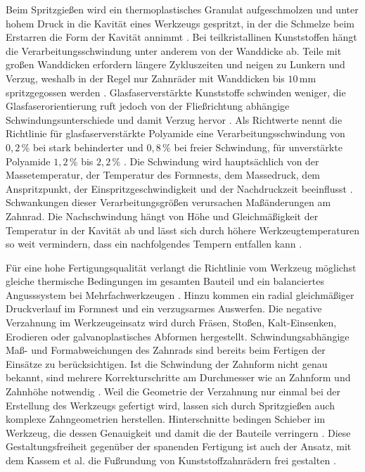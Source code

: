 Beim Spritzgießen wird ein thermoplastisches Granulat aufgeschmolzen und unter hohem Druck in die Kavität eines Werkzeugs gespritzt, in der die Schmelze beim Erstarren die Form der Kavität annimmt \cite[S.~25]{VDI2736-1}. Bei teilkristallinen Kunststoffen hängt die Verarbeitungsschwindung unter anderem von der Wanddicke ab. Teile mit großen Wanddicken erfordern längere Zykluszeiten und neigen zu Lunkern und Verzug, weshalb in der Regel nur Zahnräder mit Wanddicken bis $10$\,mm spritzgegossen werden \cite[S.~25]{VDI2736-1}. Glasfaserverstärkte Kunststoffe schwinden weniger, die Glasfaserorientierung ruft jedoch von der Fließrichtung abhängige Schwindungsunterschiede und damit Verzug hervor \cite[S.~25]{VDI2736-1}. Als Richtwerte nennt die Richtlinie für glasfaserverstärkte Polyamide eine Verarbeitungsschwindung von $0{,}2$\,\% bei stark behinderter und $0{,}8$\,\% bei freier Schwindung, für unverstärkte Polyamide $1{,}2$\,\% bis $2{,}2$\,\% \cite[S.~26]{VDI2736-1}. Die Schwindung wird hauptsächlich von der Massetemperatur, der Temperatur des Formnests, dem Massedruck, dem Anspritzpunkt, der Einspritzgeschwindigkeit und der Nachdruckzeit beeinflusst \cite[S.~26]{VDI2736-1}. Schwankungen dieser Verarbeitungsgrößen verursachen Maßänderungen am Zahnrad. Die Nachschwindung hängt von Höhe und Gleichmäßigkeit der Temperatur in der Kavität ab und lässt sich durch höhere Werkzeugtemperaturen so weit vermindern, dass ein nachfolgendes Tempern entfallen kann \cite[S.~26 f.]{VDI2736-1}.

Für eine hohe Fertigungsqualität verlangt die Richtlinie vom Werkzeug möglichst gleiche thermische Bedingungen im gesamten Bauteil und ein balanciertes Angusssystem bei Mehrfachwerkzeugen \cite[S.~27 f.]{VDI2736-1}. Hinzu kommen ein radial gleichmäßiger Druckverlauf im Formnest und ein verzugsarmes Auswerfen. Die negative Verzahnung im Werkzeugeinsatz wird durch Fräsen, Stoßen, Kalt-Einsenken, Erodieren oder galvanoplastisches Abformen hergestellt. Schwindungsabhängige Maß- und Formabweichungen des Zahnrads sind bereits beim Fertigen der Einsätze zu berücksichtigen. Ist die Schwindung der Zahnform nicht genau bekannt, sind mehrere Korrekturschritte am Durchmesser wie an Zahnform und Zahnhöhe notwendig \cite[S.~28]{VDI2736-1}. Weil die Geometrie der Verzahnung nur einmal bei der Erstellung des Werkzeugs gefertigt wird, lassen sich durch Spritzgießen auch komplexe Zahngeometrien herstellen. Hinterschnitte bedingen Schieber im Werkzeug, die dessen Genauigkeit und damit die der Bauteile verringern \cite[S.~28]{VDI2736-1}. Diese Gestaltungsfreiheit gegenüber der spanenden Fertigung ist auch der Ansatz, mit dem Kassem et al. die Fußrundung von Kunststoffzahnrädern frei gestalten \cite[S.~2]{Kas22}.

